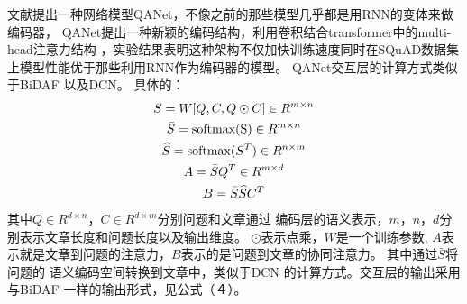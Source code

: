 文献\cite{QANet}提出一种网络模型QANet，不像之前的那些模型几乎都是用RNN的变体来做编码器，
QANet提出一种新颖的编码结构，利用卷积结合transformer中的multi-head注意力结构
，实验结果表明这种架构不仅加快训练速度同时在SQuAD数据集上模型性能优于那些利用RNN作为编码器的模型。
QANet交互层的计算方式类似于BiDAF
以及DCN。
具体的：
\begin{gather}
    S=W[Q,C,Q\odot C]\in R^{m\times n}\notag \\
    \bar{S}=\text{softmax(S)}\in R^{m\times n}\notag \\
    \widehat{S}=\text{softmax($S^T$)}\in R^{n\times m}\notag \\
    A=\bar{S}Q^T\in R^{m\times d} \notag \\
    B=\bar{S}\widehat{S}C^T
\end{gather}
其中$Q\in R^{d\times n}，C\in R^{d\times m}$分别问题和文章通过
编码层的语义表示，$m，n，d$分别表示文章长度和问题长度以及输出维度。
$\odot$表示点乘，$W$是一个训练参数,
$A$表示就是文章到问题的注意力，$B$表示的是问题到文章的协同注意力。
其中通过$\bar{S}$将问题的
语义编码空间转换到文章中，类似于DCN
的计算方式。交互层的输出采用与BiDAF
一样的输出形式，见公式（４）。














